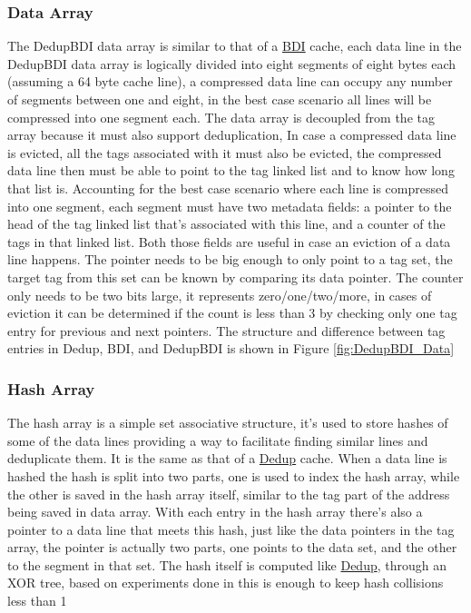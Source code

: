 \subsubsection{Data Array}
\label{sssec:DedupBDIData}
The DedupBDI data array is similar to that of a \hyperref[sssec:BDIData]{BDI} cache, each data line in the DedupBDI data array is logically divided into eight segments of eight bytes each (assuming a 64 byte cache line), a compressed data line can occupy any number of segments between one and eight, in the best case scenario all lines will be compressed into one segment each. The data array is decoupled from the tag array because it must also support deduplication, In case a compressed data line is evicted, all the tags associated with it must also be evicted, the compressed data line then must be able to point to the tag linked list and to know how long that list is. Accounting for the best case scenario where each line is compressed into one segment, each segment must have two metadata fields: a pointer to the head of the tag linked list that's associated with this line, and a counter of the tags in that linked list. Both those fields are useful in case an eviction of a data line happens. The pointer needs to be big enough to only point to a tag set, the target tag from this set can be known by comparing its data pointer. The counter only needs to be two bits large, it represents zero/one/two/more, in cases of eviction it can be determined if the count is less than 3 by checking only one tag entry for previous and next pointers. The structure and difference between tag entries in Dedup, BDI, and DedupBDI is shown in Figure \ref{fig:DedupBDI_Data}
\subsubsection{Hash Array}
\label{sssec:DedupBDIHash}
The hash array is a simple set associative structure, it's used to store hashes of some of the data lines providing a way to facilitate finding similar lines and deduplicate them. It is the same as that of a \hyperref[sssec:DedupHash]{Dedup} cache. When a data line is hashed the hash is split into two parts, one is used to index the hash array, while the other is saved in the hash array itself, similar to the tag part of the address being saved in data array. With each entry in the hash array there's also a pointer to a data line that meets this hash, just like the data pointers in the tag array, the pointer is actually two parts, one points to the data set, and the other to the segment in that set. The hash itself is computed like \hyperref[sssec:DedupHash]{Dedup}, through an XOR tree, based on experiments done in \cite{dedup} this is enough to keep hash collisions less than 1%

